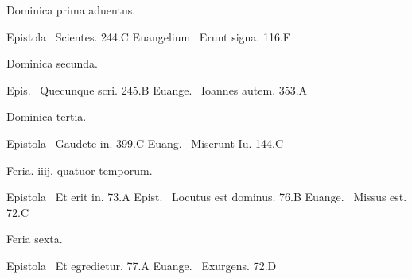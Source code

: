 \documentclass[a5paper,10pt]{book}
\begin{document}
\begin{multicols}{2}
\begin{center}
\color{red} Dominica prima aduentus.
\end{center}
\vspace{-.75em}
\par \noindent Epistola \textdagger \ Scientes. \hfill 244.C
\newline Euangelium \textdagger \ Erunt signa. \hfill 116.F
\newline \vspace{-1.75em}
\begin{center}
\color{red} Dominica secunda.
\end{center}
\vspace{-.75em}
\par \noindent Epis. \textdagger \ Quecunque scri. \hfill 245.B
\newline Euange. \textdagger \ Ioannes autem. \hfill 353.A
\newline \vspace{-1.75em}
\begin{center}
\color{red} Dominica tertia.
\end{center}
\vspace{-.75em}
\par \noindent Epistola \textdagger \ Gaudete in. \hfill 399.C
\newline Euang. \textdagger \ Miserunt Iu. \hfill 144.C
\newline \vspace{-1.75em}
\begin{center}
\color{red} Feria. iiij. quatuor temporum.
\end{center}
\vspace{-.75em}
\par \noindent Epistola \textdagger \ Et erit in. \hfill 73.A
\newline Epist. \textdagger \ Locutus est dominus. \hfill 76.B
\newline Euange. \textdagger \ Missus est. \hfill 72.C
\newline \vspace{-1.75em}
\begin{center}
\color{red} Feria sexta.
\end{center}
\vspace{-.75em}
\par \noindent Epistola \textdagger \ Et egredietur. \hfill 77.A
\newline Euange. \textdagger \ Exurgens. \hfill 72.D
\newline \vspace{-1.75em}

\end{multicols}
\end{document}
